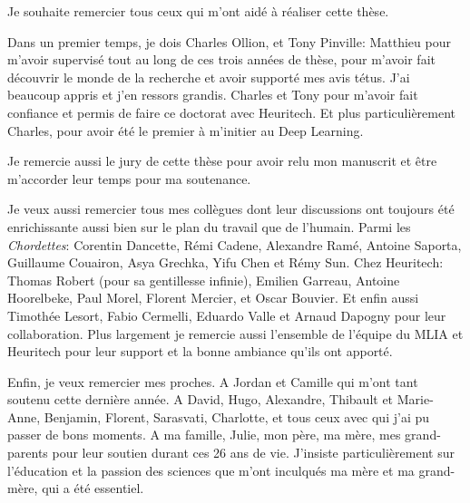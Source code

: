 
Je souhaite remercier tous ceux qui m'ont aidé à réaliser cette thèse.

Dans un premier temps, je dois Charles Ollion, et Tony Pinville: Matthieu pour m'avoir supervisé tout
au long de ces trois années de thèse, pour m'avoir fait découvrir le monde de la recherche et avoir
supporté mes avis tétus. J'ai beaucoup appris et j'en ressors grandis. Charles et Tony pour m'avoir
fait confiance et permis de faire ce doctorat avec Heuritech. Et plus particulièrement Charles, pour
avoir été le premier à m'initier au Deep Learning.

Je remercie aussi le jury de cette thèse pour avoir relu mon manuscrit et être m'accorder leur temps
pour ma soutenance.

Je veux aussi remercier tous mes collègues dont leur discussions ont toujours été enrichissante
aussi bien sur le plan du travail que de l'humain. Parmi les \textit{Chordettes}: Corentin Dancette,
Rémi Cadene, Alexandre Ramé, Antoine Saporta, Guillaume Couairon, Asya Grechka, Yifu Chen et Rémy
Sun. Chez Heuritech: Thomas Robert (pour sa gentillesse infinie), Emilien Garreau, Antoine
Hoorelbeke, Paul Morel, Florent Mercier, et Oscar Bouvier. Et enfin aussi Timothée Lesort, Fabio
Cermelli, Eduardo Valle et Arnaud Dapogny pour leur collaboration. Plus largement je remercie aussi
l'ensemble de l'équipe du MLIA et Heuritech pour leur support et la bonne ambiance qu'ils ont
apporté.

Enfin, je veux remercier mes proches. A Jordan et Camille qui m'ont tant soutenu cette dernière
année. A David, Hugo, Alexandre, Thibault et Marie-Anne, Benjamin, Florent, Sarasvati, Charlotte, et
tous ceux avec qui j'ai pu passer de bons moments. A ma famille, Julie, mon père, ma mère, mes
grand-parents pour leur soutien durant ces 26 ans de vie. J'insiste particulièrement sur l'éducation
et la passion des sciences que m'ont inculqués ma mère et ma grand-mère, qui a été essentiel.


